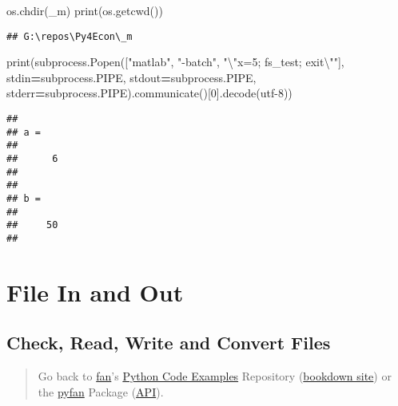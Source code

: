 \documentclass[
]{book}
\newenvironment{Shaded}{\begin{snugshade}}{\end{snugshade}}
\newcommand{\BuiltInTok}[1]{#1}
\newcommand{\CharTok}[1]{\textcolor[rgb]{0.31,0.60,0.02}{#1}}
\newcommand{\DecValTok}[1]{\textcolor[rgb]{0.00,0.00,0.81}{#1}}
\newcommand{\NormalTok}[1]{#1}
\newcommand{\OperatorTok}[1]{\textcolor[rgb]{0.81,0.36,0.00}{\textbf{#1}}}
\newcommand{\StringTok}[1]{\textcolor[rgb]{0.31,0.60,0.02}{#1}}
\begin{document}
\begin{Shaded}
\begin{Highlighting}[]
\NormalTok{os.chdir(}\StringTok{\textquotesingle{}\_m\textquotesingle{}}\NormalTok{)}
\BuiltInTok{print}\NormalTok{(os.getcwd())}
\end{Highlighting}
\end{Shaded}

\begin{verbatim}
## G:\repos\Py4Econ\_m
\end{verbatim}

\begin{Shaded}
\begin{Highlighting}[]
\BuiltInTok{print}\NormalTok{(subprocess.Popen([}\StringTok{"matlab"}\NormalTok{, }\StringTok{"{-}batch"}\NormalTok{, }\StringTok{"}\CharTok{\textbackslash{}"}\StringTok{x=5; fs\_test; exit}\CharTok{\textbackslash{}"}\StringTok{"}\NormalTok{],}
\NormalTok{                       stdin}\OperatorTok{=}\NormalTok{subprocess.PIPE,}
\NormalTok{                       stdout}\OperatorTok{=}\NormalTok{subprocess.PIPE,}
\NormalTok{                       stderr}\OperatorTok{=}\NormalTok{subprocess.PIPE).communicate()[}\DecValTok{0}\NormalTok{].decode(}\StringTok{\textquotesingle{}utf{-}8\textquotesingle{}}\NormalTok{))}
\end{Highlighting}
\end{Shaded}

\begin{verbatim}
## 
## a =
## 
##      6
## 
## 
## b =
## 
##     50
## 
\end{verbatim}

\hypertarget{file-in-and-out}{%
\section{File In and Out}\label{file-in-and-out}}

\hypertarget{check-read-write-and-convert-files}{%
\subsection{Check, Read, Write and Convert Files}\label{check-read-write-and-convert-files}}

\begin{quote}
Go back to \href{http://fanwangecon.github.io/}{fan}'s \href{https://fanwangecon.github.io/Py4Econ/}{Python Code Examples} Repository (\href{https://fanwangecon.github.io/Py4Econ/bookdown}{bookdown site}) or the \href{https://pyfan.readthedocs.io/en/latest/}{pyfan} Package (\href{https://pyfan.readthedocs.io/en/latest/reference.html}{API}).
\end{quote}
\end{document}
